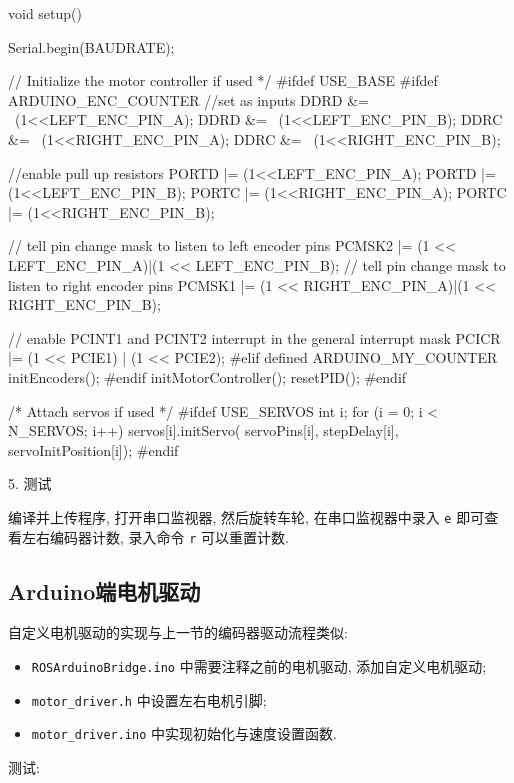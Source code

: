 \documentclass[openany, fontset=windowsold]{ctexbook}
\theoremstyle{kaiti}
\theoremstyle{normal}
\begin{document}
\begin{cpp}
  void setup() {
    Serial.begin(BAUDRATE);

  // Initialize the motor controller if used */
  #ifdef USE_BASE
    #ifdef ARDUINO_ENC_COUNTER
      //set as inputs
      DDRD &= ~(1<<LEFT_ENC_PIN_A);
      DDRD &= ~(1<<LEFT_ENC_PIN_B);
      DDRC &= ~(1<<RIGHT_ENC_PIN_A);
      DDRC &= ~(1<<RIGHT_ENC_PIN_B);

      //enable pull up resistors
      PORTD |= (1<<LEFT_ENC_PIN_A);
      PORTD |= (1<<LEFT_ENC_PIN_B);
      PORTC |= (1<<RIGHT_ENC_PIN_A);
      PORTC |= (1<<RIGHT_ENC_PIN_B);

      // tell pin change mask to listen to left encoder pins
      PCMSK2 |= (1 << LEFT_ENC_PIN_A)|(1 << LEFT_ENC_PIN_B);
      // tell pin change mask to listen to right encoder pins
      PCMSK1 |= (1 << RIGHT_ENC_PIN_A)|(1 << RIGHT_ENC_PIN_B);

      // enable PCINT1 and PCINT2 interrupt in the general interrupt mask
      PCICR |= (1 << PCIE1) | (1 << PCIE2);
    #elif defined ARDUINO_MY_COUNTER
      initEncoders();
    #endif
    initMotorController();
    resetPID();
  #endif

  /* Attach servos if used */
    #ifdef USE_SERVOS
      int i;
      for (i = 0; i < N_SERVOS; i++) {
        servos[i].initServo(
            servoPins[i],
            stepDelay[i],
            servoInitPosition[i]);
      }
    #endif
  }
\end{cpp}

5. 测试

编译并上传程序, 打开串口监视器, 然后旋转车轮, 在串口监视器中录入 \verb|e| 即可查看左右编码器计数, 录入命令 \verb|r| 可以重置计数.

\subsection{Arduino端电机驱动}

自定义电机驱动的实现与上一节的编码器驱动流程类似:

\begin{itemize}
  \item \verb|ROSArduinoBridge.ino| 中需要注释之前的电机驱动, 添加自定义电机驱动; 
  \item \verb|motor_driver.h| 中设置左右电机引脚; 
  \item \verb|motor_driver.ino| 中实现初始化与速度设置函数.
\end{itemize}

测试:
\end{document}
